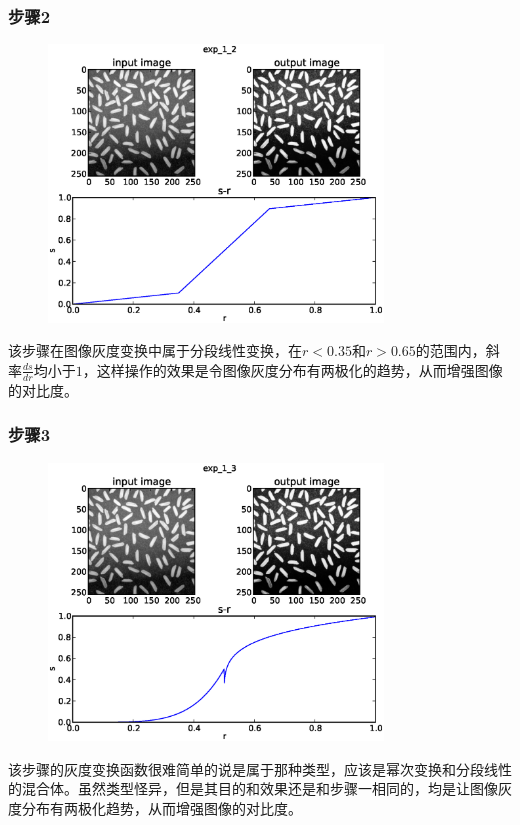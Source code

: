 \documentclass[]{IEEEphot}
\begin{document}
\subsubsection{步骤2}
\begin{figure}[h]
\centering
\includegraphics[width=21pc]{exp_1_2.eps}\\
\label{fig_env2}
\end{figure}
该步骤在图像灰度变换中属于分段线性变换，在$r<0.35$和$r>0.65$的范围内，斜率$\frac{ds}{dr}$均小于$1$，这样操作的效果是令图像灰度分布有两极化的趋势，从而增强图像的对比度。
\subsubsection{步骤3}
\begin{figure}[h]
\centering
\includegraphics[width=21pc]{exp_1_3.eps}\\
\label{fig_env2}
\end{figure}
该步骤的灰度变换函数很难简单的说是属于那种类型，应该是幂次变换和分段线性的混合体。虽然类型怪异，但是其目的和效果还是和步骤一相同的，均是让图像灰度分布有两极化趋势，从而增强图像的对比度。
\end{document}
